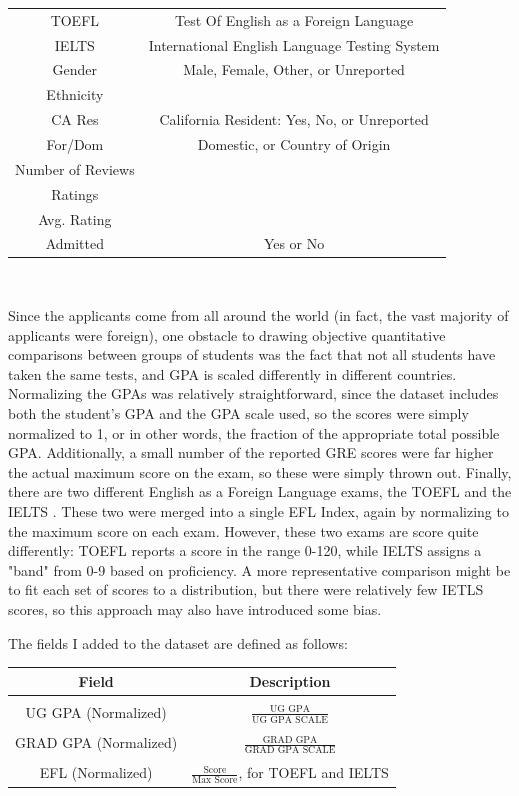 \documentclass[]{article}
\begin{document}
\begin{tabular}{c|c}
		 TOEFL & Test Of English as a Foreign Language\\
		 IELTS & International English Language Testing System \\
		 Gender & Male, Female, Other, or Unreported\\
		 Ethnicity & \\
		 CA Res & California Resident: Yes, No, or Unreported\\
		 For/Dom & Domestic, or Country of Origin\\
		 Number of Reviews & \\ 
		 Ratings & \\ 
		 Avg. Rating & \\ 
		 Admitted & Yes or No\\
		\end{tabular} \\
		
		\par Since the applicants come from all around the world (in fact, the vast majority of applicants were foreign), one obstacle to drawing objective quantitative comparisons between groups of students was the fact that not all students have taken the same tests, and GPA is scaled differently in different countries. Normalizing the GPAs was relatively straightforward, since the dataset includes both the student's GPA and the GPA scale used, so the scores were simply normalized to 1, or in other words, the fraction of the appropriate total possible GPA. Additionally, a small number of the reported GRE scores were far higher the actual maximum score on the exam\cite{GRE}, so these were simply thrown out. Finally, there are two different English as a Foreign Language exams, the TOEFL\cite{TOEFL} and the IELTS . These two were merged into a single EFL Index, again by normalizing to the maximum score on each exam. However, these two exams are score quite differently: TOEFL reports a score in the range 0-120, while IELTS assigns a "band" from 0-9 based on proficiency. A more representative comparison might be to fit each set of scores to a distribution, but there were relatively few IETLS scores, so this approach may also have introduced some bias. \\
		
		\par The fields I added to the dataset are defined as follows: \\
		
		\begin{tabular}{c|c}
		Field & Description \\ \hline \\
		UG GPA (Normalized) & $\frac {\text{UG GPA}}{\text{UG GPA SCALE}}$\\ \\
		GRAD GPA (Normalized) &  $\frac{\text{GRAD GPA}}{\text{GRAD GPA SCALE}}$\\ \\
		EFL (Normalized) & $\frac{\text{Score}}{\text{Max Score}}$, for TOEFL and IELTS\\		
		\end{tabular}
		
\end{document}
